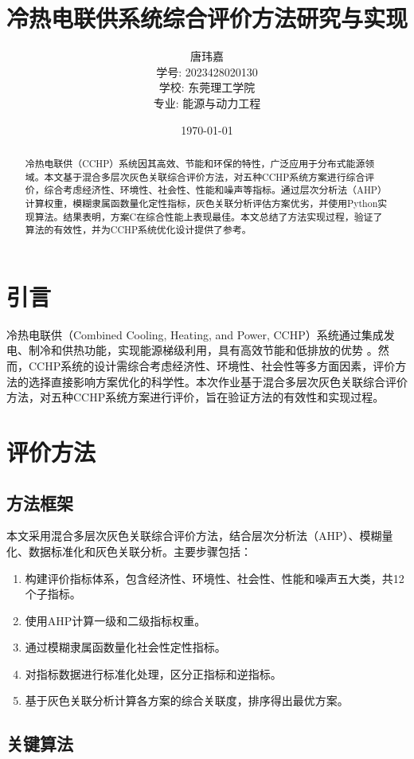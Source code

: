 \documentclass[12pt]{article}
\title{冷热电联供系统综合评价方法研究与实现}
\author{唐玮嘉 \\ 学号: 2023428020130 \\ 学校: 东莞理工学院 \\ 专业: 能源与动力工程}
\date{\today}
\begin{document}
\maketitle

\begin{abstract}
冷热电联供（CCHP）系统因其高效、节能和环保的特性，广泛应用于分布式能源领域。本文基于混合多层次灰色关联综合评价方法，对五种CCHP系统方案进行综合评价，综合考虑经济性、环境性、社会性、性能和噪声等指标。通过层次分析法（AHP）计算权重，模糊隶属函数量化定性指标，灰色关联分析评估方案优劣，并使用Python实现算法。结果表明，方案C在综合性能上表现最佳。本文总结了方法实现过程，验证了算法的有效性，并为CCHP系统优化设计提供了参考。
\end{abstract}

\section{引言}
冷热电联供（Combined Cooling, Heating, and Power, CCHP）系统通过集成发电、制冷和供热功能，实现能源梯级利用，具有高效节能和低排放的优势 \citep{cho2014combined}。然而，CCHP系统的设计需综合考虑经济性、环境性、社会性等多方面因素，评价方法的选择直接影响方案优化的科学性。本次作业基于混合多层次灰色关联综合评价方法，对五种CCHP系统方案进行评价，旨在验证方法的有效性和实现过程。

\section{评价方法}

\subsection{方法框架}
本文采用混合多层次灰色关联综合评价方法，结合层次分析法（AHP）、模糊量化、数据标准化和灰色关联分析。主要步骤包括：
\begin{enumerate}
    \item 构建评价指标体系，包含经济性、环境性、社会性、性能和噪声五大类，共12个子指标。
    \item 使用AHP计算一级和二级指标权重。
    \item 通过模糊隶属函数量化社会性定性指标。
    \item 对指标数据进行标准化处理，区分正指标和逆指标。
    \item 基于灰色关联分析计算各方案的综合关联度，排序得出最优方案。
\end{enumerate}

\subsection{关键算法}
\end{document}

